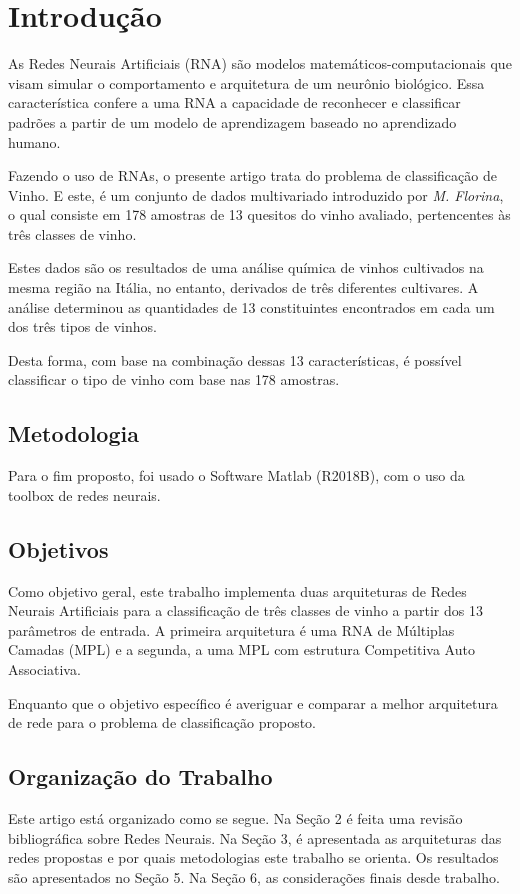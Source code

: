 
\section{Introdução}

As Redes Neurais Artificiais (RNA) são modelos matemáticos-computacionais que visam simular o comportamento e arquitetura de um neurônio biológico. Essa característica confere a uma RNA a capacidade de reconhecer e classificar padrões a partir de um modelo de aprendizagem baseado no aprendizado humano.

Fazendo o uso de RNAs, o presente artigo trata do problema de classificação de Vinho. E este, é um conjunto de dados multivariado introduzido por \textit{M. Florina}, o qual consiste em 178 amostras de 13 quesitos do vinho avaliado, pertencentes às três classes de vinho.

Estes dados são os resultados de uma análise química de vinhos cultivados na mesma região na Itália, no entanto, derivados de três diferentes cultivares. A análise determinou as quantidades de 13 constituintes encontrados em cada um dos três tipos de vinhos.

Desta forma, com base na combinação dessas 13 características, é possível classificar o tipo de vinho com base nas 178 amostras.

\subsection{Metodologia}

Para o fim proposto, foi usado o Software Matlab (R2018B), com o uso da toolbox de redes neurais.


\subsection{Objetivos}

Como objetivo geral, este trabalho implementa duas arquiteturas de Redes Neurais Artificiais para a classificação de três classes de vinho a partir dos 13 parâmetros de entrada. A primeira arquitetura é uma RNA de Múltiplas Camadas (MPL) e a segunda, a uma MPL com estrutura Competitiva Auto Associativa.

Enquanto que o objetivo específico é averiguar e comparar a melhor arquitetura de rede para o problema de classificação proposto.


\subsection{Organização do Trabalho}

Este artigo está organizado como se segue. Na Seção 2 é feita uma revisão bibliográfica sobre Redes Neurais. Na Seção 3, é apresentada as arquiteturas das redes propostas e por quais metodologias este trabalho se orienta. Os resultados são apresentados no Seção 5. Na Seção 6, as considerações finais desde trabalho.